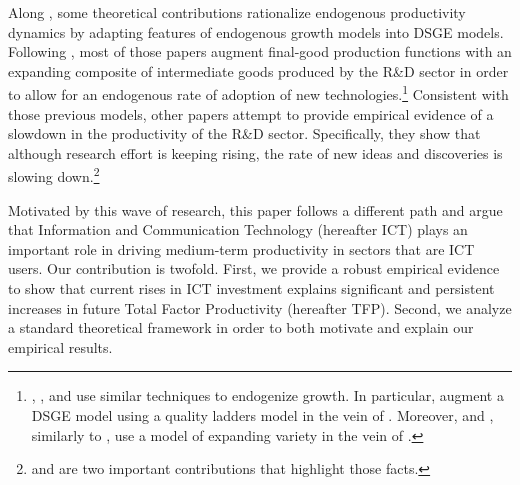 \documentclass[14pt]{article}
\begin{document}
Along \cite{comin2006medium}, some theoretical contributions rationalize endogenous productivity dynamics by adapting features of endogenous growth models into DSGE models. Following \cite{romer1990endogenous}, most of those papers augment final-good production functions with an expanding composite of intermediate goods produced by the R\&D sector in order to allow for an endogenous rate of adoption of new technologies.\footnote{\cite{bianchi2014growth}, \cite{anzoategui2016endogenous}, and \cite{moran2017innovation} use similar techniques to endogenize growth. In particular, \cite{bianchi2014growth} augment a DSGE  model using a quality ladders model in the vein of \cite{grossman1991quality}. Moreover, \cite{anzoategui2016endogenous} and \cite{moran2017innovation}, similarly to \cite{comin2006medium}, use a model of expanding variety in the vein of \cite{romer1990endogenous}.} Consistent with those previous models, other papers attempt to provide empirical evidence of a slowdown in the productivity of the R\&D sector. Specifically, they show that although research effort is keeping rising, the rate of new ideas and discoveries is slowing down.\footnote{\cite{jones2009burden} and \cite{bloom2017ideas} are two important contributions that highlight those facts.}

Motivated by this wave of research, this paper follows a different path and argue that Information and Communication Technology (hereafter ICT) plays an important role in driving medium-term productivity in sectors that are ICT users. Our contribution is twofold. First, we provide a robust empirical evidence to show that current rises in ICT investment explains significant and persistent increases in future Total Factor Productivity (hereafter TFP). Second, we analyze a standard theoretical framework in order to both motivate and explain our empirical results. 
\end{document}
